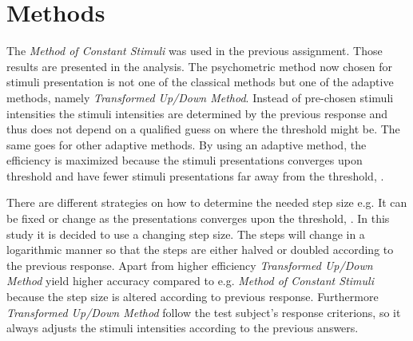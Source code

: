 \section*{Methods}
\label{Methods}
%
The \textit{Method of Constant Stimuli} was used in the previous assignment. Those results are presented in the analysis. The psychometric method now chosen for stimuli presentation is not one of the classical methods but one of the adaptive methods, namely \textit{Transformed Up/Down Method}. Instead of pre-chosen stimuli intensities the stimuli intensities are determined by the previous response and thus does not depend on a qualified guess on where the threshold might be. The same goes for other adaptive methods. By using an adaptive method, the efficiency is maximized because the stimuli presentations converges upon threshold and have fewer stimuli presentations far away from the threshold, \parencite[p. 287]{PDF:Hearing}. 

There are different strategies on how to determine the needed step size e.g. It can be fixed or change as the presentations converges upon the threshold, \parencite[p. 22]{PDF:Psychoacoustic}. In this study it is decided to use a changing step size. The steps will change in a logarithmic manner so that the steps are either halved or doubled according to the previous response. Apart from higher efficiency \textit{Transformed Up/Down Method} yield higher accuracy compared to e.g. \textit{Method of Constant Stimuli} because the step size is altered according to previous response. Furthermore \textit{Transformed Up/Down Method} follow the test subject's response criterions, so it always adjusts the stimuli intensities according to the previous answers.  

